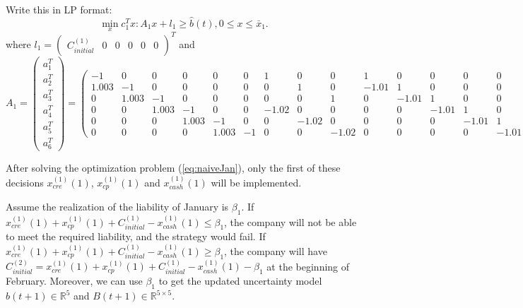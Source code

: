     Write this in LP format:
    \begin{equation}\label{eq:naiveJan}
        \min_x c_1^Tx: A_1x+l_1\geq\hat{b}(t), 0\leq x\leq \bar{x}_1.
    \end{equation}
    where $l_1 = \begin{pmatrix}C^{(1)}_{initial} & 0& 0& 0& 0& 0\end{pmatrix}^T$ and 
    \[
        A_1
        = 
        \begin{pmatrix}
            a_1^T \\
            a_2^T \\
            a_3^T \\
            a_4^T \\
            a_5^T \\
            a_6^T
        \end{pmatrix}
        =
        \begin{pmatrix}
            -1    &   0    &   0    &  0    &  0    &  0    &  1    &  0   &  0   &  1     &   0   &  0   &  0   &  0   \\
            1.003 &  -1    &   0    &  0    &  0    &  0    &  0    &  1   &  0   &  -1.01 &   1   &  0   &  0   &  0   \\
            0     & 1.003  &   -1   &  0    &  0    &  0    &  0    &  0   &  1   &  0     & -1.01 &  1   &  0   &  0   \\
            0     &  0     & 1.003  &   -1  &  0    &  0    & -1.02 &  0   &  0   &  0     &  0    & -1.01&  1   &  0   \\
            0     &  0     &  0     & 1.003 &  -1   &  0    &  0    &-1.02 &  0   &  0     &  0    &  0   &-1.01 &  1   \\
            0     &  0     &  0     &  0    & 1.003 &  -1   &  0    &  0   &-1.02 &  0     &  0    &  0   &  0   &-1.01
        \end{pmatrix}.
    \]

    After solving the optimization problem (\ref{eq:naiveJan}), only the first of these decisions $x^{(1)}_{cre}(1)$, $x^{(1)}_{cp}(1)$ and $x^{(1)}_{cash}(1)$ will be implemented. 

    Assume the realization of the liability of January is $\beta_1$. If $x^{(1)}_{cre}(1)+x^{(1)}_{cp}(1)+C^{(1)}_{initial} - x^{(1)}_{cash}(1) \leq \beta_1$, the company will not be able to meet the required liability, and the strategy would fail. If $x^{(1)}_{cre}(1)+x^{(1)}_{cp}(1)+C^{(1)}_{initial} - x^{(1)}_{cash}(1) \geq \beta_1$, the company will have $C^{(2)}_{initial} =  x^{(1)}_{cre}(1)+x^{(1)}_{cp}(1)+C^{(1)}_{initial} - x^{(1)}_{cash}(1) - \beta_1$ at the beginning of February. Moreover, we can use $\beta_1$ to get the updated uncertainty model $\hat{b}(t+1)\in\mathbb{R}^5$ and $B(t+1)\in\mathbb{R}^{5\times5}$.

